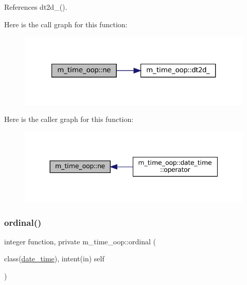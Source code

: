 References dt2d\+\_\+().

Here is the call graph for this function\+:\nopagebreak
\begin{figure}[H]
\begin{center}
\leavevmode
\includegraphics[width=321pt]{namespacem__time__oop_a7707a7cbd4869301a613ceeb12ed2384_cgraph}
\end{center}
\end{figure}
Here is the caller graph for this function\+:\nopagebreak
\begin{figure}[H]
\begin{center}
\leavevmode
\includegraphics[width=344pt]{namespacem__time__oop_a7707a7cbd4869301a613ceeb12ed2384_icgraph}
\end{center}
\end{figure}
\mbox{\label{namespacem__time__oop_a7845f6da505dff53007df45b5c198081}} 
\subsubsection{\texorpdfstring{ordinal()}{ordinal()}}
{\footnotesize\ttfamily integer function, private m\+\_\+time\+\_\+oop\+::ordinal (\begin{DoxyParamCaption}\item[{class(\mbox{\hyperlink{structm__time__oop_1_1date__time}{date\+\_\+time}}), intent(in)}]{self }\end{DoxyParamCaption})\hspace{0.3cm}{\ttfamily [private]}}



